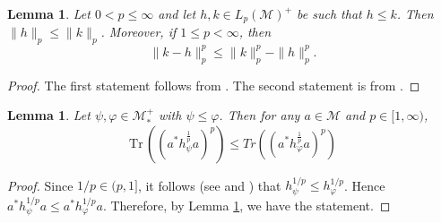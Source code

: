 \documentclass[12pt]{article}
\newtheorem{lemma}[theorem]{Lemma}
\theoremstyle{definition}
\theoremstyle{remark}
\numberwithin{equation}{section}
\def\Me{\mathcal M}
\def \Tr{\mathrm{Tr}\,}
\begin{document}
\begin{lemma}\label{lemma:order1} Let $0<p\le \infty$ and let $h,k\in L_p(\Me)^+$ be such
that $h\le k$. Then 
$\|h\|_p\le \|k\|_p$. Moreover, if $1\le p<\infty$, then 
\[
\|k-h\|_p^p\le \|k\|_p^p-\|h\|_p^p.
\]

\end{lemma}

\begin{proof} The first statement follows from \cite[Lemma 2.5 (iii) and  Lemma
4.8]{fack1986generalized}. The second statement is from \cite[Lemma
5.1]{fack1986generalized}.


\end{proof}


\begin{lemma}\label{lemma:order} Let $\psi,\varphi\in \Me_*^+$ with $\psi\le \varphi$.
Then for any $a\in \Me$ and $p\in [1,\infty)$,
\[
\Tr\left( (a^*h_\psi^{\frac1p}a)^p\right)\le Tr\left( (a^*h_\varphi^{\frac1p}a)^p\right)
\]


\end{lemma}

\begin{proof} Since $1/p\in (p,1]$, it follows (see \cite[Lemma B.7]{hiai2021quantum} and
\cite[Lemma 3.2]{hiai2021connections}) that $h_\psi^{1/p}\le h_\varphi^{1/p}$.  Hence $a^*h_\psi^{1/p}a\le a^*h_\varphi^{1/p}a$. 
Therefore, by Lemma \ref{lemma:order1}, 
we have the statement.

\end{proof}






\end{document}
